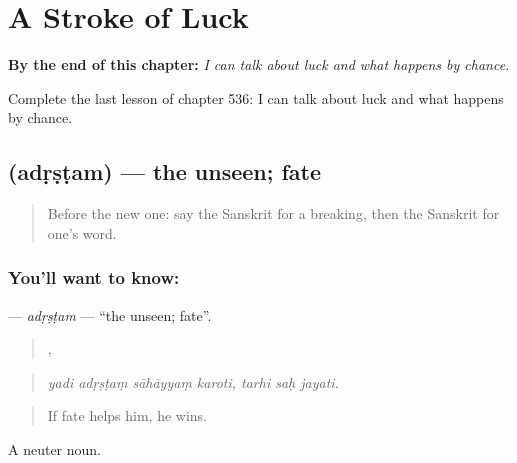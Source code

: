 
\chapter{A Stroke of Luck}
\label{ch:sa-a-stroke-of-luck}

\begin{chapteropening}
\textbf{By the end of this chapter:} \emph{I can talk about luck and what happens by chance.}

Complete the last lesson of chapter 536: I can talk about luck and what happens by chance.
\end{chapteropening}

\section[\texorpdfstring{\sk{अदृष्टम्} (adṛṣṭam)}{अदृष्टम् (adṛṣṭam)}]{ (adṛṣṭam) — the unseen; fate}

\label{lesson:SA-C536-adrstam}



\begin{quote}
Before the new one: say the Sanskrit for a breaking, then the Sanskrit for one's word.
\end{quote}

\subsection*{You'll want to know: }
\textbf{} — \emph{adṛṣṭam} — \textquotedblleft{}the unseen; fate\textquotedblright{}.

\begin{quote}
   ,   
\end{quote}

\begin{quote}
\emph{yadi adṛṣṭaṃ sāhāyyaṃ karoti, tarhi saḥ jayati.}
\end{quote}

\begin{quote}
If fate helps him, he wins.
\end{quote}

A neuter noun.

